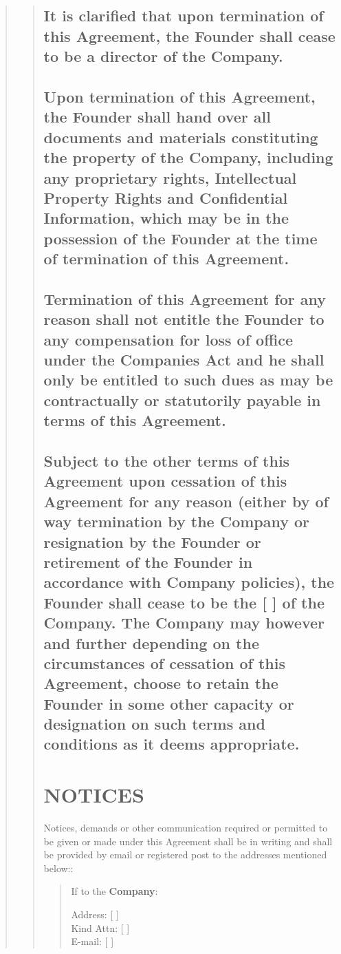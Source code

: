 \documentclass[
]{article}
\begin{document}
\begin{quote}
\begin{quote}
\subsection{It is clarified that upon termination of this Agreement, the
Founder shall cease to be a director of the Company.}
\subsection{Upon termination of this Agreement, the Founder shall hand over all
documents and materials constituting the property of the Company,
including any proprietary rights, Intellectual Property Rights and
Confidential Information, which may be in the possession of the Founder
at the time of termination of this Agreement.}
\subsection{Termination of this Agreement for any reason shall not entitle the
Founder to any compensation for loss of office under the Companies Act
and he shall only be entitled to such dues as may be contractually or
statutorily payable in
terms of this Agreement.}
\subsection{Subject to the other terms of this Agreement upon cessation of this
Agreement for any reason (either by of way termination by the Company or
resignation by the Founder or retirement of the Founder in accordance
with Company policies), the Founder shall cease to be the {[} {]} of the
Company. The Company may however and further depending on the
circumstances of cessation of this Agreement, choose to retain the
Founder in some other capacity or designation on such terms and
conditions as it deems appropriate.}

\section{NOTICES}

Notices, demands or other communication required or permitted to be
given or made under this Agreement shall be in writing and shall be
provided by email or registered post to the addresses mentioned below::

\begin{quote}
If to the \textbf{Company}:

Address: {[} {]}\\
Kind Attn: {[} {]}\\
E-mail: {[} {]}


\end{quote}
\end{quote}
\end{quote}
\end{document}
